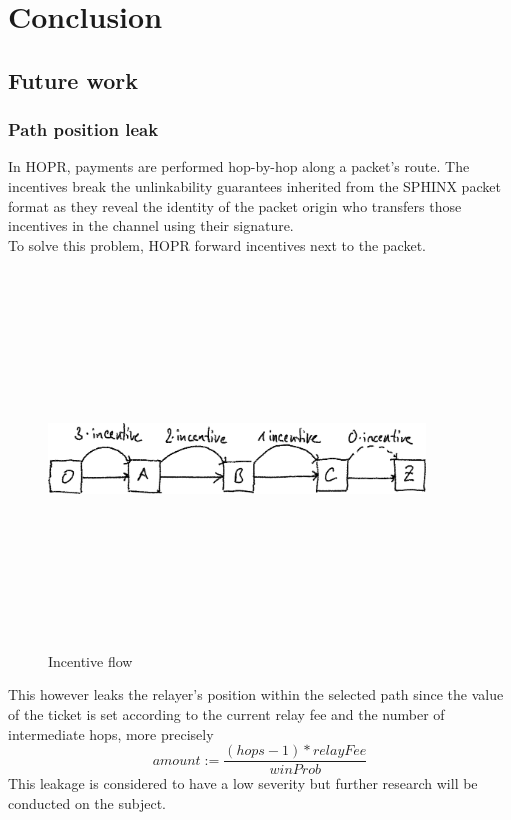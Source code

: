 \section{Conclusion}
\subsection*{Future work}
\subsubsection{Path position leak}
In HOPR, payments are performed hop-by-hop along a packet’s route.
The incentives break the unlinkability guarantees inherited from the SPHINX packet format as they reveal the identity of the packet origin who transfers those incentives in the channel using their signature. 
\\To solve this problem, HOPR forward incentives next to the packet.
\begin{figure}[H]
    \centering
    \includegraphics[width=10cm,height=10cm,keepaspectratio]{../whitepaper/images/token_cashflow.png}
    \caption{Incentive flow}
    \label{fig:Incentive flow}
    \end{figure}

    \hspace{-5mm}This however leaks the relayer’s position within the selected path since the value of the ticket is set according to the current relay fee and the number of intermediate hops, 
more precisely $$amount:=\frac{(hops -1)* relayFee}{winProb}$$
This leakage is considered to have a low severity but further research will be conducted on the subject.
